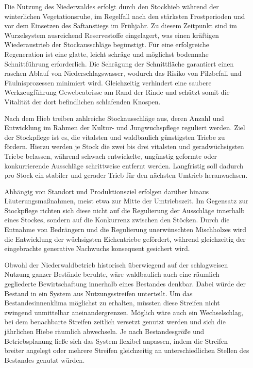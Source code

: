 \documentclass[twocolumn, bibliography=totoc, abstract=true]{scrartcl}
\begin{document}
Die Nutzung des Niederwaldes erfolgt durch den Stockhieb während der winterlichen Vegetationsruhe, im Regelfall nach den stärksten Frostperioden und vor dem Einsetzen des Saftanstiegs im Frühjahr. Zu diesem Zeitpunkt sind im Wurzelsystem ausreichend Reservestoffe eingelagert, was einen kräftigen Wiederaustrieb der Stockausschläge begünstigt. Für eine erfolgreiche Regeneration ist eine glatte, leicht schräge und möglichst bodennahe Schnittführung erforderlich. Die Schrägung der Schnittfläche garantiert einen raschen Ablauf von Niederschlagswasser, wodurch das Risiko von Pilzbefall und Fäulnisprozessen minimiert wird. Gleichzeitig verhindert eine saubere Werkzeugführung Gewebeabrisse am Rand der Rinde und schützt somit die Vitalität der dort befindlichen schlafenden Knospen.

Nach dem Hieb treiben zahlreiche Stockausschläge aus, deren Anzahl und Entwicklung im Rahmen der Kultur- und Jungwuchspflege reguliert werden. Ziel der Stockpflege ist es, die vitalsten und waldbaulich günstigsten Triebe zu fördern. Hierzu werden je Stock die zwei bis drei vitalsten und geradwüchsigsten Triebe belassen, während schwach entwickelte, ungünstig geformte oder konkurrierende Ausschläge schrittweise entfernt werden. Langfristig soll dadurch pro Stock ein stabiler und gerader Trieb für den nächsten Umtrieb heranwachsen.

Abhängig von Standort und Produktionsziel erfolgen darüber hinaus Läuterungsmaßnahmen, meist etwa zur Mitte der Umtriebszeit. Im Gegensatz zur Stockpflege richten sich diese nicht auf die Regulierung der Ausschläge innerhalb eines Stockes, sondern auf die Konkurrenz zwischen den Stöcken. Durch die Entnahme von Bedrängern und die Regulierung unerwünschten Mischholzes wird die Entwicklung der wüchsigsten Eichentriebe gefördert, während gleichzeitig der eingebrachte generative Nachwuchs konsequent gesichert wird.

Obwohl der Niederwaldbetrieb historisch überwiegend auf der schlagweisen Nutzung ganzer Bestände beruhte, wäre waldbaulich auch eine räumlich gegliederte Bewirtschaftung innerhalb eines Bestandes denkbar. Dabei würde der Bestand in ein System aus Nutzungsstreifen unterteilt. Um das Bestandesinnenklima möglichst zu erhalten, müssten diese Streifen nicht zwingend unmittelbar aneinandergrenzen. Möglich wäre auch ein Wechselschlag, bei dem benachbarte Streifen zeitlich versetzt genutzt werden und sich die jährlichen Hiebe räumlich abwechseln. Je nach Bestandesgröße und Betriebsplanung ließe sich das System flexibel anpassen, indem die Streifen breiter angelegt oder mehrere Streifen gleichzeitig an unterschiedlichen Stellen des Bestandes genutzt würden.
\end{document}
